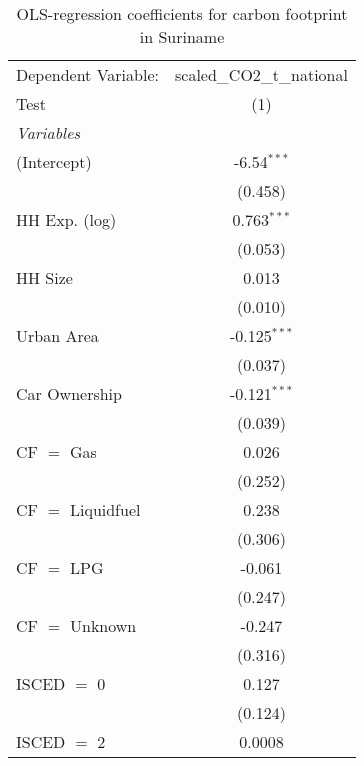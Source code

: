 
\begin{table}[htbp!]
   \centering
   \small
   \begin{adjustbox}{width = 1\textwidth, max height = 0.95\textheight, center}
      \begin{threeparttable}[b]
         \caption{\label{tab:OLS_2_SUR} OLS-regression coefficients for carbon footprint in Suriname}
         \begin{tabular}{lc}
            \tabularnewline \midrule \midrule
            Dependent Variable: & scaled\_CO2\_t\_national\\     
            Test                & (1)\\  
            \midrule
            \emph{Variables}\\
            (Intercept)         & -6.54$^{***}$\\   
                                & (0.458)\\   
            HH Exp. (log)       & 0.763$^{***}$\\   
                                & (0.053)\\   
            HH Size             & 0.013\\   
                                & (0.010)\\   
            Urban Area          & -0.125$^{***}$\\   
                                & (0.037)\\   
            Car Ownership       & -0.121$^{***}$\\   
                                & (0.039)\\   
            CF $=$ Gas          & 0.026\\   
                                & (0.252)\\   
            CF $=$ Liquidfuel   & 0.238\\   
                                & (0.306)\\   
            CF $=$ LPG          & -0.061\\   
                                & (0.247)\\   
            CF $=$ Unknown      & -0.247\\   
                                & (0.316)\\   
            ISCED $=$ 0         & 0.127\\   
                                & (0.124)\\   
            ISCED $=$ 2         & 0.0008\\   

\end{tabular}
\end{threeparttable}
\end{adjustbox}
\end{table}
